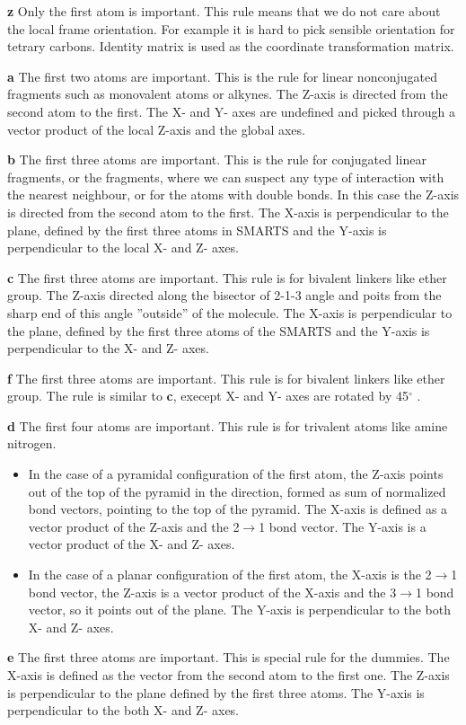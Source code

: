\documentclass[10pt,a4paper]{article}
\begin{document}
\begin{description}
\item{\textbf{z}} Only the first atom is important. This rule means that we do not care 
about the local frame orientation. 
For example it is hard to pick sensible orientation for tetrary carbons. Identity
matrix is used as the coordinate transformation matrix.
\item{\textbf{a}} The first two atoms are important. This is the rule for linear nonconjugated
fragments such as monovalent atoms or alkynes. The Z-axis is directed from the second atom to
the first. The X- and Y- axes are undefined and picked through a vector product of
the local Z-axis and the global axes.
\item{\textbf{b}} The first three atoms are important. This is the rule for conjugated
linear fragments, or the fragments, where we can suspect any type of interaction with the nearest
neighbour, or for the atoms with double bonds. In this case the Z-axis is directed from 
the second atom to the first. The X-axis is
perpendicular to the plane, defined by the first three atoms in SMARTS and the Y-axis is
perpendicular to the local X- and Z- axes.
\item{\textbf{c}} The first three atoms are important. This rule is for bivalent linkers
like ether group. 
The Z-axis directed along the bisector of 2-1-3 angle and poits from the sharp end of this
angle ''outside'' of the molecule. The X-axis is
perpendicular to the plane, defined by the first three atoms of the SMARTS and the Y-axis is 
perpendicular to the X- and Z- axes.
\item{\textbf{f}} The first three atoms are important. This rule is for bivalent linkers
like ether group. The rule is similar to \textbf{c}, execept X- and Y- axes are rotated by 
45$^{\circ}$ .
\item{\textbf{d}} The first four atoms are important. This rule is for trivalent 
atoms like amine nitrogen. 
\begin{itemize}
\item In the case of a pyramidal configuration of the first atom, the Z-axis points out of 
the top of the pyramid in the
direction, formed as sum of normalized bond vectors, pointing to the top of the pyramid.
The X-axis is defined as a vector product of the Z-axis and the 2$\rightarrow$1 bond vector. 
The Y-axis is a vector product of the X- and Z- axes.
\item In the case of a planar configuration of the first atom, the X-axis is 
the 2$\rightarrow$1 bond vector, 
the Z-axis is a vector product of the X-axis and the 3$\rightarrow$1 bond vector, so 
it points out of the plane. 
The Y-axis is perpendicular to the both X- and Z- axes.
\end{itemize}
\item{\textbf{e}} The first three atoms are important. This is special rule for the dummies. 
The X-axis is defined as the vector from the second atom to the first one. The Z-axis 
is perpendicular to the
plane defined by the first three atoms. The Y-axis is perpendicular to the both X- and Z- axes.  
\end{description}
\end{document}
